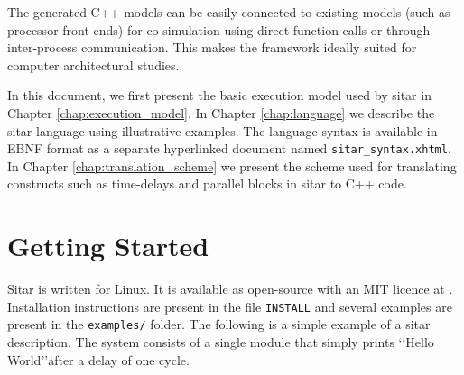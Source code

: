 \documentclass[12pt,a4paper]{report}
\begin{document}
The generated C++ models can be easily connected to
existing models (such as processor front-ends) 
for co-simulation using direct function calls or through
inter-process communication. This makes the framework ideally
suited for computer architectural studies.

In this document, we first present the basic execution model 
used by sitar in Chapter \ref{chap:execution_model}.
In Chapter \ref{chap:language} we describe the sitar language
using illustrative examples. The language syntax is available in 
EBNF format as a separate hyperlinked document named {\tt sitar\_syntax.xhtml}.
In Chapter \ref{chap:translation_scheme} we present the scheme used for 
translating constructs such as time-delays and parallel blocks
in sitar to C++ code.

\newpage
\section{Getting Started}
Sitar is written for Linux. 
It is available as open-source with an MIT licence at \cite{SitarGit}. 
Installation instructions are present in the file {\tt INSTALL} and 
several examples are present in the {\tt examples/} folder.
The following is a simple example of a sitar description. The system
consists of a single module that simply prints \lq\lq Hello World\rq\rq\.
after a delay of one cycle.
\end{document}
